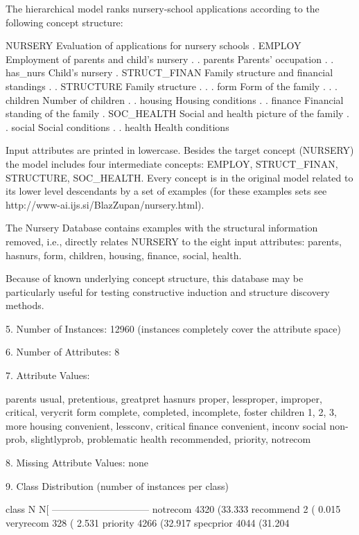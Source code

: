 \documentclass[letterpaper,12pt,titlepage,oneside,final]{book}
\begin{document}
	The hierarchical model ranks nursery-school applications according
	to the following concept structure:
	
	NURSERY            Evaluation of applications for nursery schools
	. EMPLOY           Employment of parents and child's nursery
	. . parents        Parents' occupation
	. . has\_nurs       Child's nursery
	. STRUCT\_FINAN     Family structure and financial standings
	. . STRUCTURE      Family structure
	. . . form         Form of the family
	. . . children     Number of children
	. . housing        Housing conditions
	. . finance        Financial standing of the family
	. SOC\_HEALTH       Social and health picture of the family
	. . social         Social conditions
	. . health         Health conditions
	
	Input attributes are printed in lowercase. Besides the target
	concept (NURSERY) the model includes four intermediate concepts:
	EMPLOY, STRUCT\_FINAN, STRUCTURE, SOC\_HEALTH. Every concept is in
	the original model related to its lower level descendants by a set
	of examples (for these examples sets see 
	http://www-ai.ijs.si/BlazZupan/nursery.html).
	
	The Nursery Database contains examples with the structural
	information removed, i.e., directly relates NURSERY to the eight input
	attributes: parents, hasnurs, form, children, housing, finance,
	social, health.
	
	Because of known underlying concept structure, this database may be
	particularly useful for testing constructive induction and
	structure discovery methods.
	
	5. Number of Instances: 12960
	(instances completely cover the attribute space)
	
	6. Number of Attributes: 8
	
	7. Attribute Values:
	
	parents        usual, pretentious, greatpret
	hasnurs       proper, lessproper, improper, critical, verycrit
	form           complete, completed, incomplete, foster
	children       1, 2, 3, more
	housing        convenient, lessconv, critical
	finance        convenient, inconv
	social         non-prob, slightlyprob, problematic
	health         recommended, priority, notrecom
	
	8. Missing Attribute Values: none
	
	9. Class Distribution (number of instances per class)
	
	class        N         N[%
	------------------------------
	notrecom    4320   (33.333 %
	recommend       2   ( 0.015 %
	veryrecom    328   ( 2.531 %
	priority     4266   (32.917 %
	specprior   4044   (31.204 %
	
\end{document}
